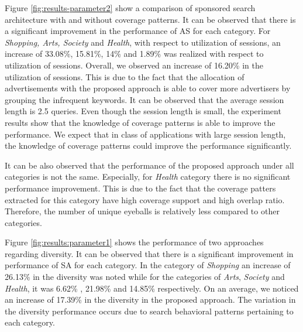 Figure \ref{fig:results-parameter2} show a comparison of sponsored search architecture with and without coverage patterns. It can be observed that there is a significant improvement in the performance of AS for each category.  For {\it Shopping, Arts, Society} and {\it Health}, with respect to utilization of sessions, an increase of 33.08\%, 15.81\%, 14\% and 1.89\% was realized with respect to utilization of sessions.  Overall, we observed an increase of 16.20\% in the utilization of sessions.
This is due to the fact that the allocation of advertisements with the proposed approach is able to cover more advertisers by grouping the infrequent keywords. It can be observed that the average session length is 2.5 queries. Even though the session length is small, the experiment results show that the knowledge of  coverage patterns is able to improve the performance. We expect  that in class of applications with large session length, the knowledge of coverage patterns could improve the performance significantly.

It can be also observed that the performance of the proposed approach under all categories is not the same. Especially, for {\it Health} category there is no significant performance improvement. This is due to the fact that the coverage patters extracted for this category have high coverage support and high overlap ratio. Therefore, the number of unique eyeballs is relatively less compared to other categories.



Figure \ref{fig:results:parameter1} shows the performance of two approaches regarding diversity. It can be observed that there is a significant improvement in performance of SA for each category.  In the category of {\it Shopping} an increase of 26.13\% in the diversity was noted while for the categories of {\it Arts}, {\it Society} and {\it Health}, it was 6.62\% , 21.98\% and 14.85\% respectively. On an average, we noticed an increase of 17.39\% in the diversity in the proposed approach. The variation in the diversity performance occurs due to search behavioral patterns pertaining to each category.



